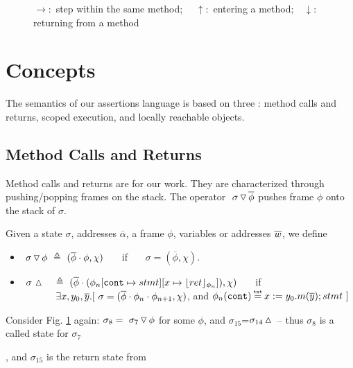 {\begin{figure}[htb]
\begin{tabular}{|c|}
\end{tabular}
   \caption{$\rightarrow$:\  step within the same method; \ \ $\uparrow$:\    entering a method;\ \  $\downarrow$:  returning from a method}
   \label{fig:UpSemantics}
 \end{figure}
 

\section{ Concepts}
\label{s:auxiliary}

{The semantics of our assertions language %
is based on three   \LangOO: {method calls and returns, scoped execution}, and locally reachable objects.}

\subsection{ Method Calls and Returns}
 
Method calls and returns are  for our work. 
They are characterized through pushing/popping   frames on the stack.  
The operator   $  \ {\sigma} \, {\triangledown}\, \overline{\phi} $ pushes 
frame $\phi$ onto the stack of $\sigma$.
 
 

\begin{definition}
\label{def:push:frame}
Given a state $\sigma$, addresses $\overline \alpha$, a frame $\phi$,  variables or addresses $\overline {w}$, we define
\begin{itemize}
\item
 $  \ {\sigma} \, {\triangledown}\, {\phi}  \ \triangleq \ ({\overline{\phi}\cdot\phi}, \chi)$ \ \ \  if \ \ \  $\sigma=(\overline{\phi}, \chi)$.
\item
$ \ \sigma\, \popSymbol \ \ \  \triangleq\   { (\overline{\phi}\cdot (\phi_n[\prg{cont}\mapsto stmt][x \mapsto \interpret {\phi_n}{ret}]), \chi)}$ \ \ \  if \\
 $\strut \hspace{1.2cm}  \exists x, y_0, \overline y. [ \ \sigma=(\overline{\phi}\cdot\phi_n\cdot\phi_{n+1}, \chi)$, and $\phi_n(\prg{cont})\txteq x:= y_0.m(\overline y); stmt \ ]$
\end{itemize}
 \end{definition}

Consider Fig. \ref{fig:UpSemantics} again: $\sigma_8 =  \ {\sigma_7} \, {\triangledown}\, {\phi} $ for some $\phi$, and  $\sigma_{15}$=$\sigma_{14} \, {\vartriangle}\,$
--  thus $\sigma_8$ is a called state for 
 $\sigma_7$}, and  $\sigma_{15}$ is the return state from 
